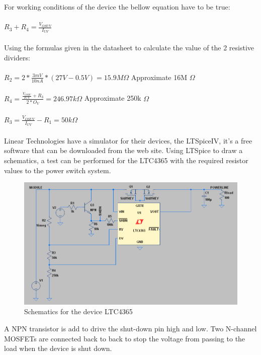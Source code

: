 For working conditions of the device the bellow equation have to be true:\\\\
$ R_3+R_4=\frac{V_{OSUV}}{I_{UV}} $\\
\\
Using the formulas given in the datasheet to calculate the value of the 2 resistive dividers:\\\\
$ R_2 = 2*\frac{3mV}{10nA}*(27V-0.5V) = 15.9M\Omega $ Approximate 16M $\Omega $\\ 
\\
$ R_4 = \frac{\frac{V_{OSIU}}{I{UV}}+R_3}{2*O_V} = 246.97k\Omega $ Approximate 250k $\Omega $\\ 
\\
$ R_3 = \frac{V_{OSUV}}{I_{UV}}-R_1 = 50k\Omega $\\
\\
%
Linear Technologies have a simulator for their devices, the LTSpiceIV, it's a free software that can be downloaded from the web site.
Using LTSpice to draw a schematics, a test can be performed for the LTC4365 with the required resistor values to the power switch system.
%
\begin{figure}[H]
	\begin{centering}
		\includegraphics[width=1\textwidth]{images/tb5_LTC_simu1.png}
		\caption{Schematics for the device LTC4365}
	\end{centering}
\end{figure}
%
A NPN transistor is add to drive the shut-down pin high and low. Two N-channel MOSFETs are connected back to back to stop the voltage from passing to the load when the device is shut down.
%
